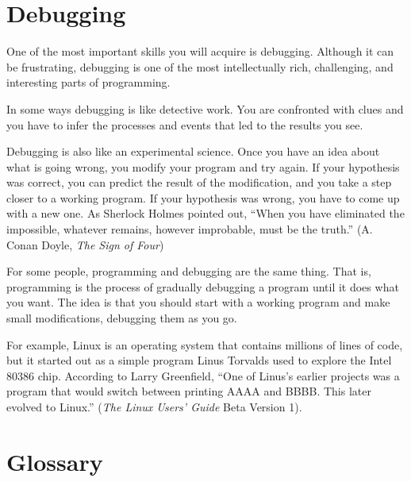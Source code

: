 %
\section{Debugging}

One of the most important skills you will acquire is debugging.
Although it can be frustrating, debugging is one of the most
intellectually rich, challenging, and interesting parts of
programming.

In some ways debugging is like detective work.  You are confronted
with clues and you have to infer the processes and events that led
to the results you see.

Debugging is also like an experimental science.  Once you have an idea
about what is going wrong, you modify your program and try again.  If
your hypothesis was correct, you can predict the result of the
modification, and you take a step closer to a working program.  If
your hypothesis was wrong, you have to come up with a new one.  As
Sherlock Holmes pointed out, ``When you have eliminated the
impossible, whatever remains, however improbable, must be the truth.''
(A. Conan Doyle, {\em The Sign of Four})

For some people, programming and debugging are the same thing.  That
is, programming is the process of gradually debugging a program until
it does what you want.  The idea is that you should start with a
working program and make small modifications,
debugging them as you go.

For example, Linux is an operating system that contains millions of
lines of code, but it started out as a simple program Linus Torvalds
used to explore the Intel 80386 chip.  According to Larry Greenfield,
``One of Linus's earlier projects was a program that would switch
between printing AAAA and BBBB.  This later evolved to Linux.''
({\em The Linux Users' Guide} Beta Version 1).


%
\section{Glossary}

